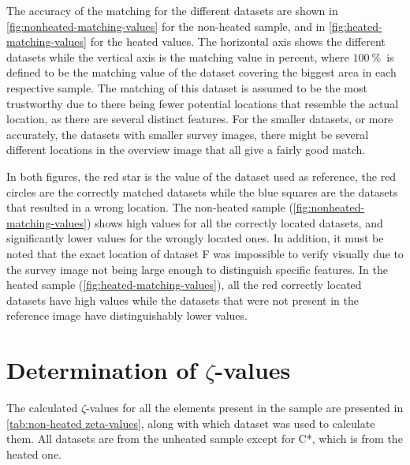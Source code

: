 The accuracy of the matching for the different datasets are shown in \cref{fig:nonheated-matching-values} for the non-heated sample, and in \cref{fig:heated-matching-values} for the heated values. The horizontal axis shows the different datasets while the vertical axis is the matching value in percent, where $\SI{100}{\percent}$ is defined to be the matching value of the dataset covering the biggest area in each respective sample. The matching of this dataset is assumed to be the most trustworthy due to there being fewer potential locations that resemble the actual location, as there are several distinct features. For the smaller datasets, or more accurately, the datasets with smaller survey images, there might be several different locations in the overview image that all give a fairly good match.


In both figures, the red star is the value of the dataset used as reference, the red circles are the correctly matched datasets while the blue squares are the datasets that resulted in a wrong location. The non-heated sample (\cref{fig:nonheated-matching-values}) shows high values for all the correctly located datasets, and significantly lower values for the wrongly located ones. In addition, it must be noted that the exact location of dataset F was impossible to verify visually due to the survey image not being large enough to distinguish specific features. In the heated sample (\cref{fig:heated-matching-values}), all the red correctly located datasets have high values while the datasets that were not present in the reference image have distinguishably lower values.

\section{Determination of $\zeta$-values}

The calculated $\zeta$-values for all the elements present in the sample are presented in \cref{tab:non-heated zeta-values}, along with which dataset was used to calculate them. All datasets are from the unheated sample except for C*, which is from the heated one.


